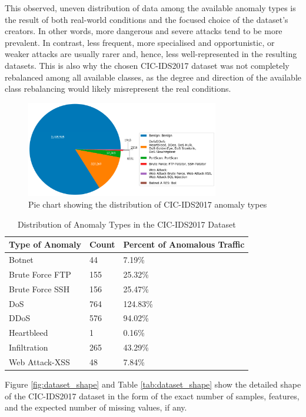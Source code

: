 This observed, uneven distribution of data among the available anomaly types is the result of both real-world conditions and the focused choice of the dataset's creators. In other words, more dangerous and severe attacks tend to be more prevalent. In contrast, less frequent, more specialised and opportunistic, or weaker attacks are usually rarer and, hence, less well-represented in the resulting datasets. This is also why the chosen CIC-IDS2017 dataset was not completely rebalanced among all available classes, as the degree and direction of the available class rebalancing would likely misrepresent the real conditions.

\begin{figure}[H] 
\centering 
\includegraphics[width=0.75\textwidth]{assets/figures/class_distr.png} 
\caption{Pie chart showing the distribution of CIC-IDS2017 anomaly types}
\label{fig:class_distr} 
\end{figure} 
\parencite{s23218788}

\begin{table}[H] 
\centering 
\caption{Distribution of Anomaly Types in the CIC-IDS2017 Dataset}
\label{tab:class_distr} 
\begin{tabular}{lll} 
\toprule 
Type of Anomaly & Count & Percent of Anomalous Traffic \\
\midrule 
Botnet & 44 & 7.19\% \\ 
Brute Force FTP & 155 & 25.32\% \\ 
Brute Force SSH & 156 & 25.47\% \\ 
DoS & 764 & 124.83\% \\ 
DDoS & 576 & 94.02\% \\ 
Heartbleed & 1 & 0.16\% \\ 
Infiltration & 265 & 43.29\% \\ 
Web Attack-XSS & 48 & 7.84\% \\ 
\bottomrule 
\end{tabular} 
\end{table} 

Figure \ref{fig:dataset_shape} and Table \ref{tab:dataset_shape} show the detailed shape of the CIC-IDS2017 dataset in the form of the exact number of samples, features, and the expected number of missing values, if any.


